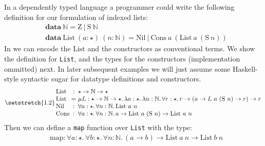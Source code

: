 In a dependently typed language a programmer could write the following definition
for our formulation of indexed lists:
\newcommand{\Nat}[0]{\mathbb{N}}
\newcommand{\Succ}[0]{\mathrm{S}}
\newcommand{\Zero}[0]{\mathrm{Z}}
\newcommand{\List}[0]{\mathrm{List}}
\newcommand{\Nil}[0]{\mathrm{Nil}}
\newcommand{\Cons}[0]{\mathrm{Cons}}
\newcommand{\map}[0]{\mathrm{map}}
\begin{align*}
  & \mathbf{data} ~ \Nat = \Zero ~|~ \Succ~\Nat \\
  & \mathbf{data} ~ \List~(a : \star)~(n : \Nat) = \Nil ~ | ~ \Cons~a~(\List~a~(\Succ~n))
\end{align*}
In \name we can encode the $\mathrm{List}$ and the constructors as conventional terms. We
show the definition for \verb|List|, and the types for the constructors (implementation ommitted)
next. In later subsequent examples we will just assume some Haskell-style
syntactic sugar for datatype definitions and constructors.
\begin{equation*}
\setlength{\arraycolsep}{1.5pt}
\setstretch{1.2}
\begin{array}{lcl}
\List &:& \star \rightarrow \Nat \rightarrow \star \\
\List &=& \mu L : \star \rightarrow \Nat \rightarrow \star.\, \lambda a:\star.\, \lambda n :\Nat.\, \forall r:\star.\, r \rightarrow (a \rightarrow L~a~(\Succ ~ n) \rightarrow r) \rightarrow r \\
\Nil &:& \forall a : \star.\, \forall n : \Nat.\, \List ~ a ~ n \\
\Cons &:& \forall a : \star.\, \forall n : \Nat.\, a \rightarrow \List ~ a ~ (\Succ ~ n) \rightarrow \List ~ a ~n \\
\end{array}
\end{equation*}
\noindent Then we can define a \verb|map| function over \verb|List| with the type:
\begin{align*}
  & \map : \forall a : \star.\, \forall b : \star.\, \forall n : \Nat .\, (a \rightarrow b) \rightarrow \List~a~n \rightarrow \List~b~n 
\end{align*}
